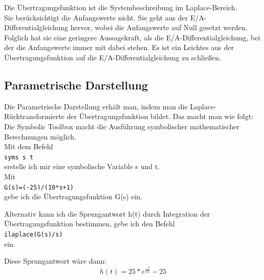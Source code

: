 Die Übertragungsfunktion ist die Systembeschreibung im Laplace-Bereich.\\
Sie berücksichtigt die Anfangswerte nicht. Sie geht aus der E/A-Differential\-gleichung hervor, wobei die Anfangswerte auf Null gesetzt werden. Folglich hat sie eine geringere Aussagekraft, als die E/A-Differentialgleichung, bei der die Anfangswerte immer mit dabei stehen. Es ist ein Leichtes aus der Übertragungsfunktion auf die E/A-Differentialgleichung zu schließen.
\subsection{Parametrische Darstellung} %
Die Parametrische Darstellung erhält man, indem man die Laplace-Rücktransformierte der Übertragungsfunktion bildet.
Das macht man wie folgt:\\
Die Symbolic Toolbox macht die Ausführung symbolischer mathematischer Berechnungen möglich.\\
Mit dem Befehl\\
\texttt{syms s t}\\
erstelle ich mir eine symbolische Variable s und t.\\
Mit\\
\texttt{G(s)=(-25)/(10*s+1)}\\
gebe ich die Übertragungsfunktion G(s) ein.

Alternativ kann ich die Sprungantwort h(t) durch Integration der Übertragungsfunktion bestimmen, gebe ich den Befehl \\
\texttt{ilaplace(G(s)/s)}\\
ein.



Diese Sprungantwort wäre dann:
\begin{equation*}
    h(t)=25*e^{\frac{-t}{10}}-25
\end{equation*}

